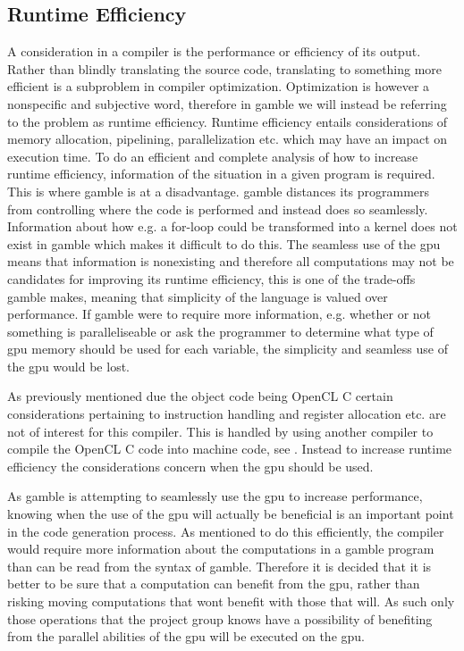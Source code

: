 \subsection*{Runtime Efficiency}\label{subsec:runtime}
A consideration in a compiler is the performance or efficiency of its output. 
Rather than blindly translating the source code, translating to something more efficient is a subproblem in compiler optimization.
Optimization is however a nonspecific and subjective word, therefore in \gls{gamble} we will instead be referring to the problem as runtime efficiency.
Runtime efficiency entails considerations of memory allocation, pipelining, parallelization etc. which may have an impact on execution time.
To do an efficient and complete analysis of how to increase runtime efficiency, information of the situation in a given program is required.
This is where \gls{gamble} is at a disadvantage. 
\gls{gamble} distances its programmers from controlling where the code is performed and instead does so seamlessly.
Information about how e.g. a for-loop could be transformed into a kernel does not exist in \gls{gamble} which makes it difficult to do this.
The seamless use of the \acrshort{gpu} means that information is nonexisting and therefore all computations may not be candidates for improving its runtime efficiency, this is one of the trade-offs \gls{gamble} makes, meaning that simplicity of the language is valued over performance.
If \gls{gamble} were to require more information, e.g. whether or not something is paralleliseable or ask the programmer to determine what type of \acrshort{gpu} memory should be used for each variable, the simplicity and seamless use of the \acrshort{gpu} would be lost.

As previously mentioned due the object code being OpenCL C certain considerations pertaining to instruction handling and register allocation etc. are not of interest for this compiler.
This is handled by using another compiler to compile the OpenCL C code into machine code, see . 
Instead to increase runtime efficiency the considerations concern when the \acrshort{gpu} should be used.

As \gls{gamble} is attempting to seamlessly use the \acrshort{gpu} to increase performance, knowing when the use of the \acrshort{gpu} will actually be beneficial is an important point in the code generation process.
As mentioned to do this efficiently, the compiler would require more information about the computations in a \gls{gamble} program than can be read from the syntax of \gls{gamble}.
Therefore it is decided that it is better to be sure that a computation can benefit from the \acrshort{gpu}, rather than risking moving computations that wont benefit with those that will.
As such only those operations that the project group knows have a possibility of benefiting from the parallel abilities of the \acrshort{gpu} will be executed on the \acrshort{gpu}. 

